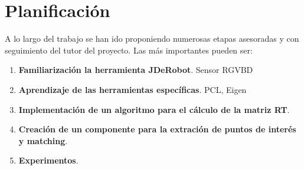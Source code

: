 \section{Planificación}

A lo largo del trabajo se han ido proponiendo numerosas etapas asesoradas y con seguimiento del tutor del proyecto. Las más importantes pueden ser:

\begin{enumerate}

\item \textbf{Familiarización la herramienta JDeRobot}. Sensor RGVBD

\item \textbf{Aprendizaje de las herramientas específicas}. PCL, Eigen

\item \textbf{Implementación de un algoritmo para el cálculo de la matriz RT}.

\item \textbf{Creación de un componente para la extración de puntos de interés y matching}.

\item \textbf{Experimentos}.

\end{enumerate}